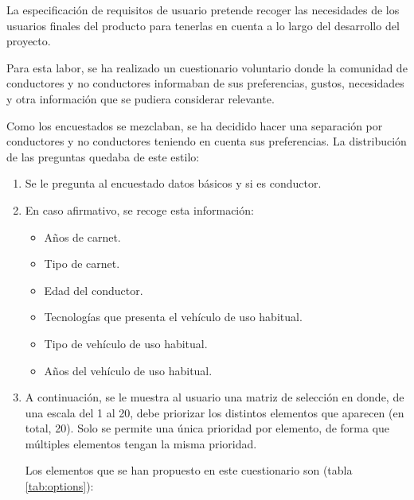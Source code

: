 La especificación de requisitos de usuario pretende recoger las necesidades de
los usuarios finales del producto para tenerlas en cuenta a lo largo del desarrollo
del proyecto.

Para esta labor, se ha realizado un cuestionario voluntario donde la comunidad de
conductores y no conductores informaban de sus preferencias, gustos, necesidades y
otra información que se pudiera considerar relevante.

Como los encuestados se mezclaban, se ha decidido hacer una separación por
conductores y no conductores teniendo en cuenta sus preferencias. La distribución
de las preguntas quedaba de este estilo:

\begin{enumerate}
  \item Se le pregunta al encuestado datos básicos y si es conductor.
  \item En caso afirmativo, se recoge esta información:
        \begin{itemize}
          \item Años de carnet.
          \item Tipo de carnet.
          \item Edad del conductor.
          \item Tecnologías que presenta el vehículo de uso habitual.
          \item Tipo de vehículo de uso habitual.
          \item Años del vehículo de uso habitual.
        \end{itemize}
  \item A continuación, se le muestra al usuario una matriz de selección en donde,
        de una escala del 1 al 20, debe priorizar los distintos elementos que aparecen
        (en total, 20). Solo se permite una única prioridad por elemento, de forma que
        múltiples elementos tengan la misma prioridad.

        Los elementos que se han propuesto en este cuestionario son (tabla \ref{tab:options}):


\end{enumerate}
